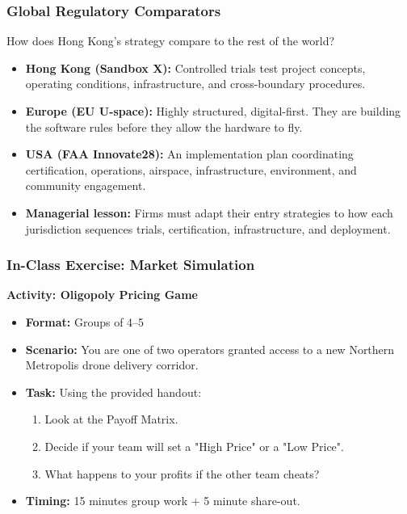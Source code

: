 \documentclass{beamer}
\begin{document}
\begin{frame}[t]
  \frametitle{Global Regulatory Comparators}
  
  How does Hong Kong's strategy compare to the rest of the world?

  \begin{itemize}
    \item \textbf{Hong Kong (Sandbox X):} Controlled trials test project concepts, operating conditions, infrastructure, and cross-boundary procedures.
    \item \textbf{Europe (EU U-space):} Highly structured, digital-first. They are building the software rules before they allow the hardware to fly.
    \item \textbf{USA (FAA Innovate28):} An implementation plan coordinating certification, operations, airspace, infrastructure, environment, and community engagement.
    \item \textbf{Managerial lesson:} Firms must adapt their entry strategies to how each jurisdiction sequences trials, certification, infrastructure, and deployment.
  \end{itemize}
\end{frame}

\begin{frame}[t]
  \frametitle{In-Class Exercise: Market Simulation}
  
  \textbf{Activity: Oligopoly Pricing Game}
  \begin{itemize}
    \item \textbf{Format:} Groups of 4–5
    \item \textbf{Scenario:} You are one of two operators granted access to a new Northern Metropolis drone delivery corridor.
    \item \textbf{Task:} Using the provided handout:
    \begin{enumerate}
        \item Look at the Payoff Matrix.
        \item Decide if your team will set a "High Price" or a "Low Price".
        \item What happens to your profits if the other team cheats?
    \end{enumerate}
    \item \textbf{Timing:} 15 minutes group work + 5 minute share-out.
  \end{itemize}
\end{frame}
\end{document}
